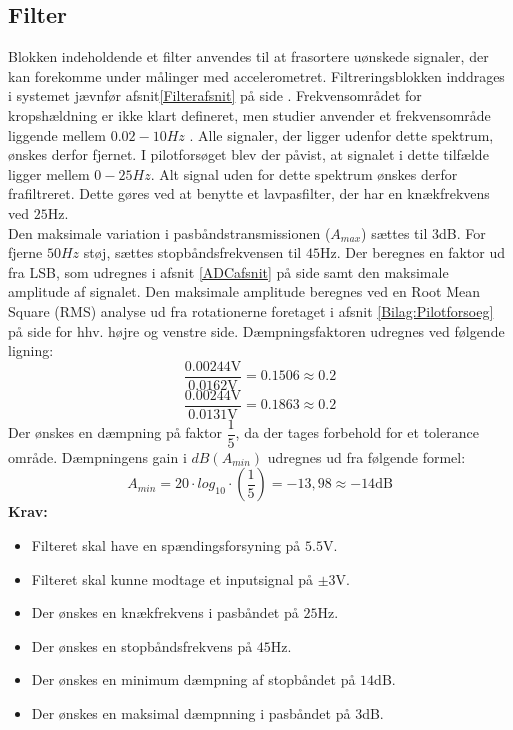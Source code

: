 \subsection{Filter}\label{FilterAfs}
Blokken indeholdende et filter anvendes til at frasortere uønskede signaler, der kan forekomme under målinger med accelerometret. Filtreringsblokken inddrages i systemet jævnfør afsnit\ref{Filterafsnit} på side \pageref{Filterafsnit}. Frekvensområdet for kropshældning er ikke klart defineret, men studier anvender et frekvensområde liggende mellem $0.02-10Hz$ \cite{Martinez-Mendez2011}. Alle signaler, der ligger udenfor dette spektrum, ønskes derfor fjernet. I pilotforsøget blev der påvist, at signalet i dette tilfælde ligger mellem $0-25Hz$. Alt signal uden for dette spektrum ønskes derfor frafiltreret. Dette gøres ved at benytte et lavpasfilter, der har en knækfrekvens ved $25$Hz. \\
Den maksimale variation i pasbåndstransmissionen ($A_{max}$) sættes til $3$dB. For fjerne $50Hz$ støj, sættes stopbåndsfrekvensen til $45$Hz. Der beregnes en faktor ud fra LSB, som udregnes i afsnit \ref{ADCafsnit} på side \pageref{ADCafsnit} samt den maksimale amplitude af signalet. Den maksimale amplitude beregnes ved en Root Mean Square (RMS) analyse ud fra rotationerne foretaget i afsnit \ref{Bilag:Pilotforsoeg} på side \pageref{Bilag:Pilotforsoeg} for hhv. højre og venstre side. Dæmpningsfaktoren udregnes ved følgende ligning:
\begin{equation}
\label{eq:daempningsfaktor}
\dfrac{0.00244\text{V}}{0.0162\text{V}} = 0.1506 \approx 0.2 
\end{equation}
\begin{equation}
\dfrac{0.00244\text{V}}{0.0131\text{V}} = 0.1863  \approx 0.2
\end{equation}
Der ønskes en dæmpning på faktor $\dfrac{1}{5}$, da der tages forbehold for et tolerance område. Dæmpningens gain i $dB(A_{min})$ udregnes ud fra følgende formel:   
\begin{equation}
\label{eq:daempningsfaktoridB}
A_{min}=20 \cdot log_{10} \cdot (\frac{1}{5}) = -13,98 \approx -14\text{dB}
\end{equation}
\textbf{Krav:}
\begin{itemize}
	\item Filteret skal have en spændingsforsyning på $5.5$V.
	\item Filteret skal kunne modtage et inputsignal på $\pm3$V.
	\item Der ønskes en knækfrekvens i pasbåndet på $25$Hz.
	\item Der ønskes en stopbåndsfrekvens på $45$Hz.
	\item Der ønskes en minimum dæmpning af stopbåndet på $14$dB.
	\item Der ønskes en maksimal dæmpnning i pasbåndet på $3$dB.
\end{itemize}
